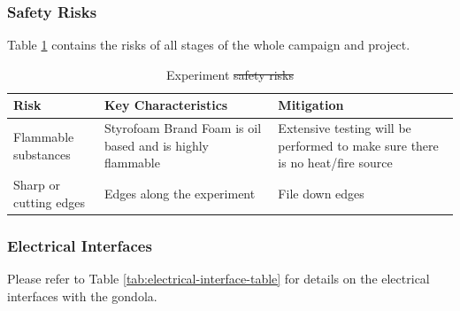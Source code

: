 \documentclass[a4paper,12pt,twoside]{article}
\providecommand{\DIFaddtex}[1]{{\protect\color{blue}\uwave{#1}}} %
\providecommand{\DIFdeltex}[1]{{\protect\color{red}\sout{#1}}}                      %
\providecommand{\DIFaddFL}[1]{\DIFadd{#1}} %
\providecommand{\DIFdelFL}[1]{\DIFdel{#1}} %
\providecommand{\DIFaddbeginFL}{} %
\providecommand{\DIFaddendFL}{} %
\providecommand{\DIFdelbeginFL}{} %
\providecommand{\DIFdelendFL}{} %
\providecommand{\DIFadd}[1]{\texorpdfstring{\DIFaddtex{#1}}{#1}} %
\providecommand{\DIFdel}[1]{\texorpdfstring{\DIFdeltex{#1}}{}} %
\newcommand{\DIFscaledelfig}{0.5}
\newlength{\DIFdelgraphicswidth} %
\newlength{\DIFdelgraphicsheight} %
\newcommand{\DIFaddincludegraphics}[2][]{{\color{blue}\fbox{\DIFOincludegraphics[#1]{#2}}}} %
\newcommand{\DIFdelincludegraphics}[2][]{%
\sbox{\DIFdelgraphicsbox}{\DIFOincludegraphics[#1]{#2}}%
\settoboxwidth{\DIFdelgraphicswidth}{\DIFdelgraphicsbox} %
\settoboxtotalheight{\DIFdelgraphicsheight}{\DIFdelgraphicsbox} %
\scalebox{\DIFscaledelfig}{%
\parbox[b]{\DIFdelgraphicswidth}{\usebox{\DIFdelgraphicsbox}\\[-\baselineskip] \rule{\DIFdelgraphicswidth}{0em}}\llap{\resizebox{\DIFdelgraphicswidth}{\DIFdelgraphicsheight}{%
\setlength{\unitlength}{\DIFdelgraphicswidth}%
\begin{picture}(1,1)%
\thicklines\linethickness{2pt} %
{\color[rgb]{1,0,0}\put(0,0){\framebox(1,1){}}}%
{\color[rgb]{1,0,0}\put(0,0){\line( 1,1){1}}}%
{\color[rgb]{1,0,0}\put(0,1){\line(1,-1){1}}}%
\end{picture}%
}\hspace*{3pt}}} %
} %
\DeclareRobustCommand{\DIFaddbeginFL}{\DIFOaddbeginFL \let\includegraphics\DIFaddincludegraphics} %
\DeclareRobustCommand{\DIFaddendFL}{\DIFOaddendFL \let\includegraphics\DIFOincludegraphics} %
\DeclareRobustCommand{\DIFdelbeginFL}{\DIFOdelbeginFL \let\includegraphics\DIFdelincludegraphics} %
\DeclareRobustCommand{\DIFdelendFL}{\DIFOaddendFL \let\includegraphics\DIFOincludegraphics} %
\begin{document}
\subsubsection{Safety Risks}
Table \ref{tab:safrisk} contains the risks of all stages of the whole campaign and project.
\begin{table}[H]
\centering

\begin{tabular}{|m{}|m{}|m{}|}
\hline
\textbf{Risk}          & \textbf{Key Characteristics}                              & \textbf{Mitigation}                                                           \\ \hline
Flammable substances    & Styrofoam Brand Foam is oil based and is highly flammable & Extensive testing will be performed to make sure there is no heat/fire source \\ \hline
Sharp or cutting edges & Edges along the experiment                                & File down edges                                                               \\ \hline
\end{tabular}
\caption{Experiment \DIFdelbeginFL \DIFdelFL{safety risks}\DIFdelendFL \DIFaddbeginFL \DIFaddFL{Safety Risks}\DIFaddendFL }
\label{tab:safrisk}
\end{table}
\raggedbottom

\pagebreak
\subsubsection{Electrical Interfaces}

Please refer to Table \ref{tab:electrical-interface-table} for details on the electrical interfaces with the gondola.
\end{document}
